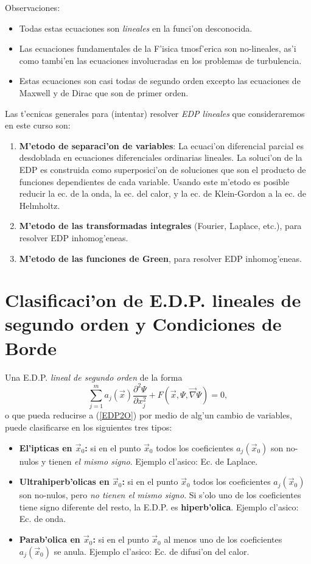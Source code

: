 Observaciones:

\begin{itemize}
\item Todas estas ecuaciones son \textit{lineales} en la funci'on desconocida.
\item Las ecuaciones fundamentales de la F'isica tmosf'erica son no-lineales, as'i como tambi'en las ecuaciones involucradas en los problemas de turbulencia.
\item Estas ecuaciones son casi todas de segundo orden excepto las ecuaciones de Maxwell y de Dirac que son de primer orden.
\end{itemize}

Las t'ecnicas generales para (intentar) resolver \textit{EDP lineales} que consideraremos en este curso son:
\begin{enumerate}
\item \textbf{M'etodo de separaci'on de variables}: La ecuaci'on diferencial parcial es desdoblada en ecuaciones diferenciales ordinarias lineales. La soluci'on de la EDP es construida como superposici'on de soluciones que son el producto de funciones dependientes de cada variable. Usando este m'etodo es posible reducir la ec. de la onda, la ec. del calor, y la ec. de Klein-Gordon a la ec. de Helmholtz.
\item \textbf{M'etodo de las transformadas integrales} (Fourier, Laplace, etc.), para resolver EDP inhomog'eneas.
\item \textbf{M'etodo de las funciones de Green}, para resolver EDP inhomog'eneas.

\end{enumerate}

\section{Clasificaci'on de E.D.P. lineales de segundo orden y Condiciones de Borde}

Una E.D.P. \textit{lineal de segundo orden} de la forma \cite{Hassani}
\begin{equation}\label{EDP2O}
\sum_{j=1}^m a_j(\vec{x})\frac{\partial^2\Psi}{\partial x_j^2}+F\left(\vec{x},\Psi,\vec\nabla\Psi\right)=0,
\end{equation}
o que pueda reducirse a (\ref{EDP2O}) por medio de alg'un cambio de variables, puede clasificarse en los siguientes tres tipos:
\begin{itemize}
\item \textbf{El'ipticas en $\vec{x}_0$:} si en el punto $\vec{x}_0$ todos los coeficientes $a_j(\vec{x}_0)$ son no-nulos y tienen \textit{el mismo signo}. Ejemplo cl'asico: Ec. de Laplace.
\item \textbf{Ultrahiperb'olicas en $\vec{x}_0$:} si en el punto $\vec{x}_0$ todos los coeficientes $a_j(\vec{x}_0)$ son no-nulos, pero \textit{no tienen el mismo signo}. Si s'olo uno de los coeficientes tiene signo diferente del resto, la E.D.P. es \textbf{hiperb'olica}. Ejemplo cl'asico: Ec. de onda.
\item \textbf{Parab'olica en $\vec{x}_0$:} si en el punto $\vec{x}_0$ al menos uno de los coeficientes $a_j(\vec{x}_0)$ se anula. Ejemplo cl'asico: Ec. de difusi'on del calor.
\end{itemize}

